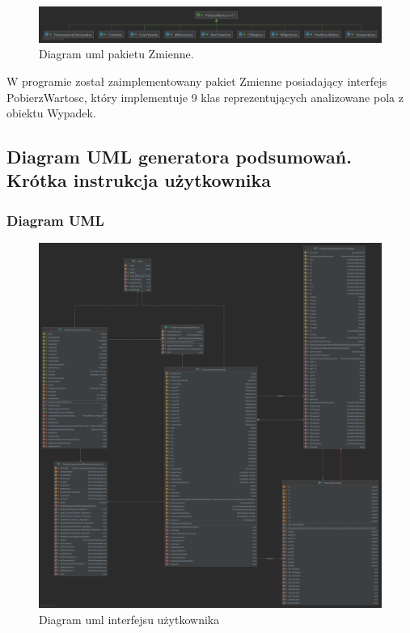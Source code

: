 \documentclass{classrep}
\begin{document}
\begin{figure}[h!]
 \centering
 \includegraphics[width=14cm]{uml_2.png}
 \vspace{-0.3cm}
 \caption{Diagram uml pakietu Zmienne. }
 \label{uml_zmienne}
\end{figure}


W programie został zaimplementowany pakiet Zmienne posiadający interfejs PobierzWartosc, który implementuje 9 klas reprezentujących analizowane pola z obiektu Wypadek. 

\newpage

\subsection{Diagram UML generatora podsumowań. Krótka instrukcja użytkownika} 

\subsubsection{Diagram UML}


\begin{figure}[h!]
 \centering
 \includegraphics[width=15cm]{uml_3.png}
 \vspace{-0.3cm}
 \caption{Diagram uml interfejsu użytkownika }
 \label{uml_gui}
\end{figure}
\end{document}

